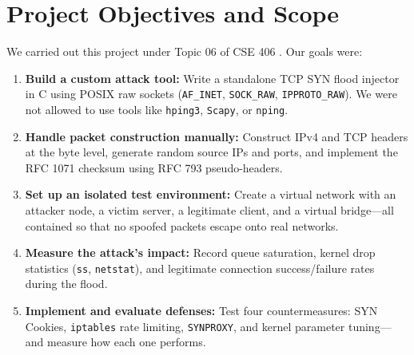 \documentclass[11pt,a4paper]{report}
\begin{document}
\section{Project Objectives and Scope}
We carried out this project under Topic 06 of CSE 406 \cite{buet_cse406}. Our goals were:
\begin{enumerate}
    \item \textbf{Build a custom attack tool:} Write a standalone TCP SYN flood injector in C using POSIX raw sockets (\texttt{AF\_INET}, \texttt{SOCK\_RAW}, \texttt{IPPROTO\_RAW}). We were not allowed to use tools like \texttt{hping3}, \texttt{Scapy}, or \texttt{nping}.
    \item \textbf{Handle packet construction manually:} Construct IPv4 and TCP headers at the byte level, generate random source IPs and ports, and implement the RFC 1071 \cite{rfc1071} checksum using RFC 793 \cite{rfc793} pseudo-headers.
    \item \textbf{Set up an isolated test environment:} Create a virtual network with an attacker node, a victim server, a legitimate client, and a virtual bridge---all contained so that no spoofed packets escape onto real networks.
    \item \textbf{Measure the attack's impact:} Record queue saturation, kernel drop statistics (\texttt{ss}, \texttt{netstat}), and legitimate connection success/failure rates during the flood.
    \item \textbf{Implement and evaluate defenses:} Test four countermeasures: SYN Cookies, \texttt{iptables} rate limiting, \texttt{SYNPROXY}, and kernel parameter tuning---and measure how each one performs.
\end{enumerate}
\end{document}
